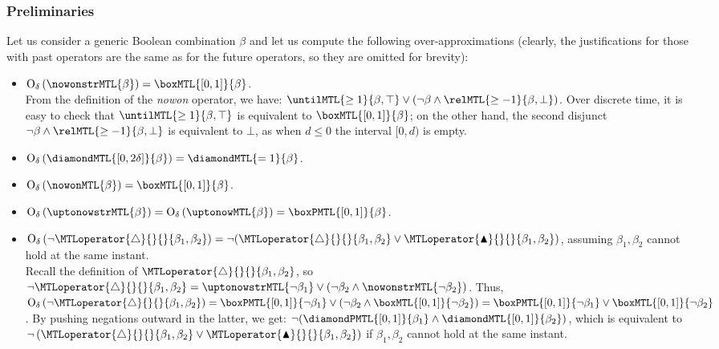 \documentclass[a4paper]{article}
\newcommand{\overap}[1]{\mathrm{O}_{\delta}\left({#1}\right)}
\newcommand{\logictrue}{\top}
\newcommand{\logicfalse}{\bot}
\newcommand{\becomesMTL}[1]{\MTLoperator{\triangle}{}{}{#1}}
\newcommand{\becomesOMTL}[1]{\MTLoperator{\blacktriangle}{}{}{#1}}
\theoremstyle{plain}
\theoremstyle{definition}
\begin{document}
\subsubsection{Preliminaries} \label{sec:prelim}
Let us consider a generic Boolean combination $\beta$ and let us compute the following over-ap\-prox\-i\-ma\-tions (clearly, the justifications for those with past operators are the same as for the future operators, so they are omitted for brevity):
\begin{itemize}
  \item $\overap{\nowonstrMTL{\beta}} = \boxMTL{[0,1]}{\beta}$. \\
	 From the definition of the \emph{nowon} operator, we have: $\untilMTL{\geq 1}{\beta, \logictrue} \vee (\neg \beta \wedge \relMTL{\geq -1}{\beta, \logicfalse})$.
	 Over discrete time, it is easy to check that $\untilMTL{\geq 1}{\beta, \logictrue}$ is equivalent to $\boxMTL{[0, 1]}{\beta}$; on the other hand, the second disjunct $\neg \beta \wedge \relMTL{\geq -1}{\beta, \logicfalse}$ is equivalent to $\logicfalse$, as when $d \leq 0$ the interval $[0, d)$ is empty.

  \item $\overap{\diamondMTL{[0,2\delta]}{\beta}} = \diamondMTL{=1}{\beta}$.

  \item $\overap{\nowonMTL{\beta}} = \boxMTL{[0,1]}{\beta}$.
	 
  \item $\overap{\uptonowstrMTL{\beta}} = \overap{\uptonowMTL{\beta}} = \boxPMTL{[0,1]}{\beta}$.

  \item $\overap{\neg \becomesMTL{\beta_1, \beta_2}} = \neg (\becomesMTL{\beta_1, \beta_2} \vee \becomesOMTL{\beta_1, \beta_2})$, assuming $\beta_1,\beta_2$ cannot hold at the same instant. \\
	 Recall the definition of $\becomesMTL{\beta_1, \beta_2}$, so $\neg \becomesMTL{\beta_1, \beta_2} = \uptonowstrMTL{\neg \beta_1} \vee (\neg \beta_2 \wedge \nowonstrMTL{\neg \beta_2})$.
	 Thus, $\overap{\neg \becomesMTL{\beta_1, \beta_2}} = \boxPMTL{[0,1]}{\neg \beta_1} \vee (\neg \beta_2 \wedge \boxMTL{[0,1]}{\neg \beta_2}) = \boxPMTL{[0,1]}{\neg \beta_1} \vee \boxMTL{[0,1]}{\neg \beta_2}$.
	 By pushing negations outward in the latter, we get: $\neg ( \diamondPMTL{[0,1]}{\beta_1} \wedge \diamondMTL{[0,1]}{\beta_2} )$, which is equivalent to $\neg \left( \becomesMTL{\beta_1, \beta_2} \vee \becomesOMTL{\beta_1, \beta_2} \right)$ if $\beta_1,\beta_2$ cannot hold at the same instant.
\end{itemize}
\end{document}

